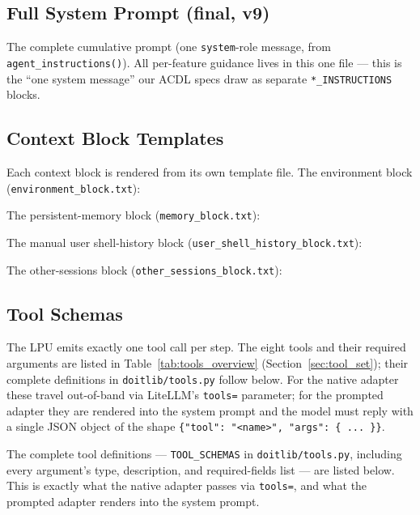 \documentclass[11pt,a4paper]{article}
\begin{document}
\subsection{Full System Prompt (final, v9)}
\label{sec:full_system_prompt}
The complete cumulative prompt (one \texttt{system}-role message, from \texttt{agent\_instructions()}). All per-feature guidance lives in this one file --- this is the ``one system message'' our ACDL specs draw as separate \texttt{*\_INSTRUCTIONS} blocks.


\subsection{Context Block Templates}
\label{sec:context_templates}
Each context block is rendered from its own template file. The environment block (\texttt{environment\_block.txt}):

The persistent-memory block (\texttt{memory\_block.txt}):

The manual user shell-history block (\texttt{user\_shell\_history\_block.txt}):

The other-sessions block (\texttt{other\_sessions\_block.txt}):


\subsection{Tool Schemas}
\label{sec:tool_schemas}
The LPU emits exactly one tool call per step. The eight tools and their required arguments are listed in Table~\ref{tab:tools_overview} (Section~\ref{sec:tool_set}); their complete definitions in \texttt{doitlib/tools.py} follow below. For the native adapter these travel out-of-band via LiteLLM's \texttt{tools=} parameter; for the prompted adapter they are rendered into the system prompt and the model must reply with a single JSON object of the shape \texttt{\{"tool": "<name>", "args": \{ ... \}\}}.

The complete tool definitions --- \texttt{TOOL\_SCHEMAS} in \texttt{doitlib/tools.py}, including every argument's type, description, and required-fields list --- are listed below. This is exactly what the native adapter passes via \texttt{tools=}, and what the prompted adapter renders into the system prompt.


\end{document}

